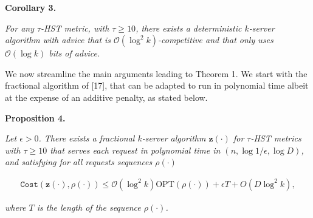 

\par\medskip\noindent\textbf{
\textbf{Corollary 3}\textbf{.}
}\par



\emph{For any $\tau$-HST metric, with $\tau\geq 10$, there exists a deterministic $k$-server algorithm with advice that is $\mathcal{O}(\log^{2}k)$-competitive and that only uses $\mathcal{O}(\log k)$ bits of advice.}\par






We now streamline the main arguments leading to Theorem 1. We start with the fractional algorithm of [17], that can be adapted to run in polynomial time albeit at the expense of an additive penalty, as stated below.\par





\par\medskip\noindent\textbf{
\textbf{Proposition 4}\textbf{.}
}\par



\emph{Let $\epsilon>0$. There exists a
fractional $k$-server algorithm ${\mathbf{z}}(\cdot)$ for $\tau$-HST metrics with $\tau\geq 10$ that serves each request in polynomial time in $(n,\log 1/\epsilon,\log D)$, and satisfying for all requests sequences $\rho(\cdot)$}\par


\[\begin{gathered}
{\texttt{Cost}}({\mathbf{z}}(\cdot),\rho(\cdot))\leq\mathcal{O}(\log^{2}k){\text{OPT}}(\rho(\cdot))+\epsilon T+O(D\log^{2}k),
\end{gathered}\]


\emph{where $T$ is the length of the sequence $\rho(\cdot)$.}\par






